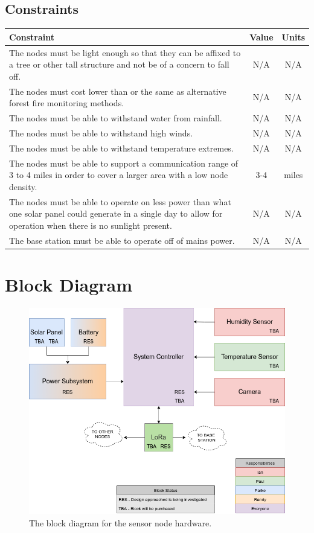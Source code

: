 \documentclass{article}
\begin{document}
\subsection{Constraints}
\begin{tabularx}{\linewidth}{|X|c|c|}
\hline
Constraint & Value & Units \\
\hline
The nodes must be light enough so that they can be affixed to a tree or other tall structure and not be of a concern to fall off. & N/A & N/A \\\hline
The nodes must cost lower than or the same as alternative forest fire monitoring methods. & N/A & N/A \\\hline
The nodes must be able to withstand water from rainfall. & N/A & N/A \\\hline
The nodes must be able to withstand high winds. & N/A & N/A \\\hline
The nodes must be able to withstand temperature extremes. & N/A & N/A \\\hline
The nodes must be able to support a communication range of 3 to 4 miles in order to cover a larger area with a low node density. & 3-4 & miles \\\hline
The nodes must be able to operate on less power than what one solar panel could generate in a single day to allow for operation when there is no sunlight present. & N/A & N/A \\\hline
The base station must be able to operate off of mains power. & N/A & N/A \\\hline

\end{tabularx}


\section{Block Diagram}
\begin{figure}[H]
    \centering
    \includegraphics[width=4.6in]{"./hwNodeBD.png"} 
    \caption{The block diagram for the sensor node hardware.}
    \label{fig:hwNodeBD}
\end{figure}
\end{document}
